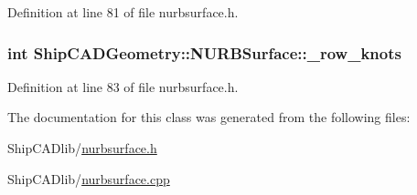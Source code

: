 Definition at line 81 of file nurbsurface.\-h.

\hypertarget{classShipCADGeometry_1_1NURBSurface_a79ed680d5cafd6d893e099e9e93bead2}{
\subsubsection[{\-\_\-row\-\_\-knots}]{\setlength{\rightskip}{0pt plus 5cm}int Ship\-C\-A\-D\-Geometry\-::\-N\-U\-R\-B\-Surface\-::\-\_\-row\-\_\-knots\hspace{0.3cm}{\ttfamily [protected]}}}\label{classShipCADGeometry_1_1NURBSurface_a79ed680d5cafd6d893e099e9e93bead2}


Definition at line 83 of file nurbsurface.\-h.



The documentation for this class was generated from the following files\-:\begin{DoxyCompactItemize}
\item 
Ship\-C\-A\-Dlib/\hyperlink{nurbsurface_8h}{nurbsurface.\-h}\item 
Ship\-C\-A\-Dlib/\hyperlink{nurbsurface_8cpp}{nurbsurface.\-cpp}\end{DoxyCompactItemize}
